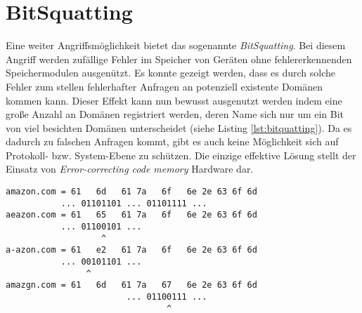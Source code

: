 
\section{BitSquatting}

Eine weiter Angriffsmöglichkeit bietet das sogenannte \textit{BitSquatting}. Bei diesem Angriff werden zufällige Fehler im Speicher von Geräten ohne fehlererkennenden Speichermodulen ausgenützt. Es konnte gezeigt werden, dass es durch solche Fehler zum stellen fehlerhafter Anfragen an potenziell existente Domänen kommen kann\cite{Dinaburg2011}. Dieser Effekt kann nun bewusst ausgenutzt werden indem eine große Anzahl an Domänen registriert werden, deren Name sich nur um ein Bit von viel besichten Domänen unterscheidet (siehe Listing \ref{lst:bitquatting}). Da es dadurch zu falschen Anfragen kommt, gibt es auch keine Möglichkeit sich auf Protokoll- bzw. System-Ebene zu schützen. Die einzige effektive Lösung stellt der Einsatz von \textit{Error-correcting code memory} Hardware dar.  

\begin{lstlisting}[caption={Drei mögliche BitSquatting-Domänen für die Zieldomäne \texttt{amazon.com}}, label={lst:bitquatting}]
amazon.com = 61   6d   61 7a   6f   6e 2e 63 6f 6d
           ... 01101101 ... 01101111 ... 
aeazon.com = 61   65   61 7a   6f   6e 2e 63 6f 6d  
           ... 01100101 ...
                   ^
a-azon.com = 61   e2   61 7a   6f   6e 2e 63 6f 6d 
           ... 00101101 ...
                ^
amazgn.com = 61   6d   61 7a   67   6e 2e 63 6f 6d
                        ... 01100111 ...
                                ^
\end{lstlisting}
